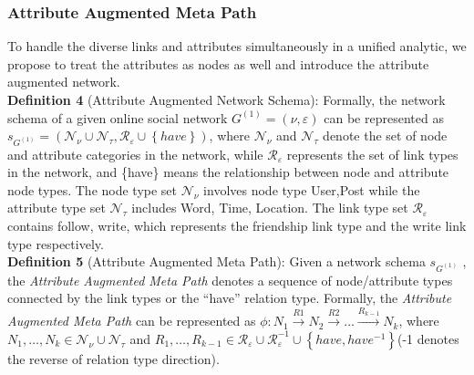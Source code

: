\documentclass{article}
\begin{document}
\subsubsection{Attribute Augmented Meta Path}
\indent To handle the diverse links
and attributes simultaneously in a unified analytic, we propose to
treat the attributes as nodes as well and introduce the attribute
augmented network.\\
\textbf{Definition 4} (Attribute Augmented Network Schema): Formally, the network schema of a given online social network $G^{(1)} = (\nu, \varepsilon)$ can be represented as $s_{G^{(1)}} = (\mathcal{N}_{\nu}\cup\mathcal{N}_{\tau}, \mathcal{R}_{\varepsilon}\cup \left\{ have \right\})$, where $\mathcal{N}_{\nu}$ and $\mathcal{N}_{\tau}$ denote the set of node and attribute categories in the network, while $\mathcal{R}_{\varepsilon}$ represents the set of link types in the network, and \{have\} means the relationship between node and attribute node types. The node type set $\mathcal{N}_{\nu}$ involves node type {User,Post} while the attribute type set $\mathcal{N}_{\tau}$ includes {Word, Time, Location}. The link type set $\mathcal{R}_{\varepsilon}$ contains {follow, write}, which represents the friendship link type and the write link type respectively.\\
\textbf{Definition 5} (Attribute Augmented Meta Path): Given a network schema $s_{G^{(1)}}$ , the \emph{Attribute Augmented Meta Path} denotes a sequence of  node/attribute types connected by the link types or the “have” relation type. Formally, the \emph{Attribute Augmented Meta Path}
can be represented as $\phi: N_{1} \xrightarrow{R1} N_{2} \xrightarrow{R2} \dots \xrightarrow{R_{k-1}} N_{k}$, where $N_{1},\dots,N_{k} \in \mathcal{N}_{\nu} \cup \mathcal{N}_{\tau}$ and
$R_{1},\dots,R_{k-1} \in \mathcal{R}_{\varepsilon} \cup \mathcal{R}_{\varepsilon}^{-1} \cup \left\{ have, have^{-1}\right\}$(-1 denotes the reverse of relation type direction).
\end{document}
